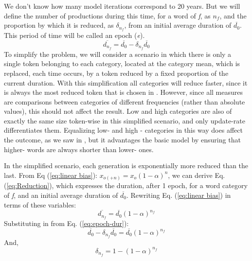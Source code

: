 We don't know how many model iterations correspond to 20 years. But
we will define the number of productions during this time, for a word
of  \emph{f}, as $n_{f}$, and the proportion by which it
is reduced, as $\delta_{n_{f}}$, from an initial average duration
of $\overline{d_{0}}$. This period of time will be called an epoch
(\emph{e}). 
\begin{equation}
\overline{d_{n_{f}}}=\overline{d_{0}}-\delta_{n_{f}}\overline{d_{0}}\label{eq:epoch-dur}
\end{equation}
To simplify the problem, we will consider a scenario in which there
is only a single token belonging to each category, located at the
category mean, which is replaced, each time  occurs, by
a token reduced by a fixed proportion of the current duration. With
this simplification all categories will reduce faster, since it is
always the most reduced token that is chosen in . However,
since all measures are comparisons between categories of different
frequencies (rather than absolute values), this should not affect
the result. Low and high  categories are also of exactly
the same size token-wise in this simplified scenario, and only update-rate
differentiates them. Equalizing low- and high - categories
in this way does affect the outcome, as we saw in ,
but it advantages the basic model by ensuring that higher-
words are always shorter than lower- ones.

In the simplified scenario, each generation is exponentially more
reduced than the last. From Eq (\ref{eq:linear bias}): $x_{o(+n)}=x_{o}\left(1-\alpha\right)^{n}$,
we can derive Eq. (\ref{eq:Reduction}), which expresses the duration,
after 1 epoch, for a word category of  \emph{f}, and an
initial average duration of $\overline{d_{0}}$. Rewriting Eq. (\ref{eq:linear bias})
in terms of these variables:
\begin{equation}
\overline{d_{n_{f}}}=\overline{d_{0}}(1-\alpha)^{n_{f}}
\end{equation}
Substituting in from Eq. (\ref{eq:epoch-dur}):
\begin{equation}
\overline{d_{0}}-\delta_{n_{f}}\overline{d_{0}}=\overline{d_{0}}(1-\alpha)^{n_{f}}
\end{equation}
And, 
\begin{equation}
\delta_{n_{f}}=1-(1-\alpha)^{n_{f}}\label{eq:Reduction}
\end{equation}

